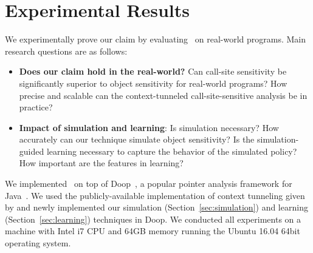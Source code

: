 
\section{Experimental Results}\label{sec:evaluation}\label{sec:result}
We experimentally prove our claim by evaluating \ourtechnique~on real-world programs. 
Main research questions are as follows: 
\begin{itemize}[leftmargin=1.3em]
\item \textbf{Does our claim hold in the real-world?} 
Can call-site sensitivity be significantly superior to object sensitivity for real-world programs? 
How precise and scalable can the
  context-tunneled call-site-sensitive analysis be in practice? 

\item \textbf{Impact of simulation and learning}: 
Is simulation necessary? 
How accurately can our technique simulate object sensitivity?  Is the simulation-guided learning necessary to capture the behavior of the simulated policy? How important are the features in learning?


\end{itemize}


%
%

We implemented \ourtechnique~on top of Doop~\cite{BravenboerS09}, a
popular pointer analysis framework for Java~\cite{JeJeOh18, Li2018b,
  JeJeChOh17, TanLX16, Smaragdakis2014}.  
We used the publicly-available implementation of context
tunneling given by \cite{JeJeOh18} and newly implemented our
simulation (Section~\ref{sec:simulation}) and learning
(Section~\ref{sec:learning}) techniques in Doop.  We conducted all
experiments on a machine with Intel i7 CPU and 64GB memory running the
Ubuntu 16.04 64bit operating system.


